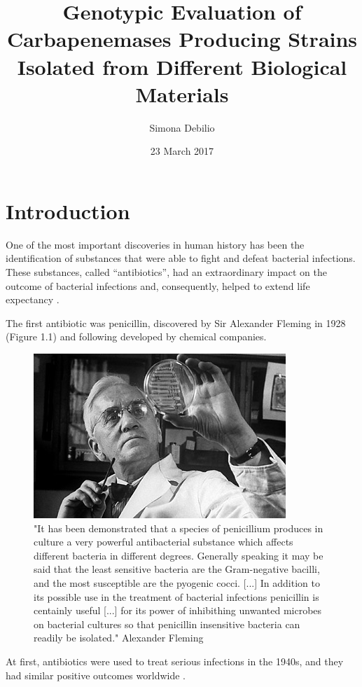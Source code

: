 \documentclass[11pt]{report}
\title{\textbf{Genotypic Evaluation of Carbapenemases Producing Strains Isolated from Different Biological Materials}}
\author{Simona Debilio}
\date{23 March 2017}
\begin{document}
\maketitle

\tableofcontents

\chapter{Introduction}
One of the most important discoveries in human history has been the identification of substances that were able to fight and defeat bacterial infections.
These substances, called “antibiotics”, had an extraordinary impact on the outcome of bacterial infections and, consequently, helped to extend life expectancy \cite{ventola2015antibiotic}.

The first antibiotic was penicillin, discovered by Sir Alexander Fleming in 1928 (Figure 1.1) and following developed by chemical companies.

\begin{figure}[htp]
\centering
\includegraphics[scale=1.10]{img/Fleming_piastra.jpg}
\caption{"It has been demonstrated that a species of penicillium produces in culture a very powerful antibacterial substance which affects different bacteria in different degrees. Generally speaking it may be said that the least sensitive bacteria are the Gram-negative bacilli, and the most susceptible are the pyogenic cocci. [...] In addition to its possible use in the treatment of bacterial infections penicillin is centainly useful [...] for its power of inhibithing unwanted microbes on bacterial cultures so that penicillin insensitive bacteria can readily be isolated." Alexander Fleming }
\label{}
\end{figure}

\clearpage
At first, antibiotics were used to treat serious infections in the 1940s, and they had similar positive outcomes worldwide \cite{Spellberg2014}.
\end{document}
